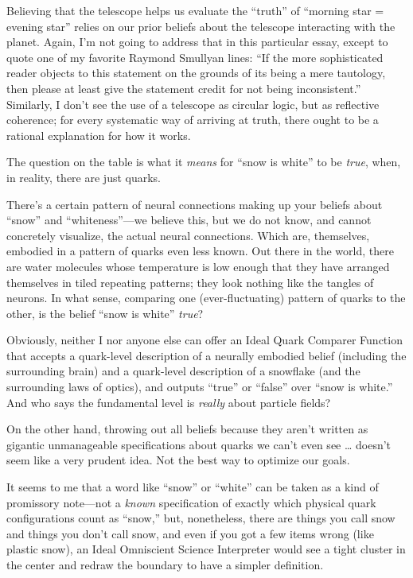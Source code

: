{
 Believing that the telescope helps us evaluate the
``truth'' of
``morning star = evening star''
relies on our prior beliefs about the telescope interacting with the
planet. Again, I'm not going to address that in this
particular essay, except to quote one of my favorite Raymond Smullyan
lines: ``If the more sophisticated reader objects to
this statement on the grounds of its being a mere tautology, then
please at least give the statement credit for not being
inconsistent.'' Similarly, I don't
see the use of a telescope as circular logic, but as reflective
coherence; for every systematic way of arriving at truth, there ought
to be a rational explanation for how it works.}

{
 The question on the table is what it \textit{means} for
``snow is white'' to be
\textit{true}, when, in reality, there are just quarks.}

{
 There's a certain pattern of neural connections
making up your beliefs about
``snow'' and
``whiteness''---we believe this, but
we do not know, and cannot concretely visualize, the actual neural
connections. Which are, themselves, embodied in a pattern of quarks
even less known. Out there in the world, there are water molecules
whose temperature is low enough that they have arranged themselves in
tiled repeating patterns; they look nothing like the tangles of
neurons. In what sense, comparing one (ever-fluctuating) pattern of
quarks to the other, is the belief ``snow is
white'' \textit{true}?}

{
 Obviously, neither I nor anyone else can offer an Ideal Quark
Comparer Function that accepts a quark-level description of a neurally
embodied belief (including the surrounding brain) and a quark-level
description of a snowflake (and the surrounding laws of optics), and
outputs ``true'' or
``false'' over
``snow is white.'' And who says the
fundamental level is \textit{really} about particle fields?}

{
 On the other hand, throwing out all beliefs because they
aren't written as gigantic unmanageable specifications
about quarks we can't even see \ldots
doesn't seem like a very prudent idea. Not the best way
to optimize our goals.}

{
 It seems to me that a word like
``snow'' or
``white'' can be taken as a kind of
promissory note---not a \textit{known} specification of exactly which
physical quark configurations count as
``snow,'' but, nonetheless, there
are things you call snow and things you don't call
snow, and even if you got a few items wrong (like plastic snow), an
Ideal Omniscient Science Interpreter would see a tight cluster in the
center and redraw the boundary to have a simpler definition.}

